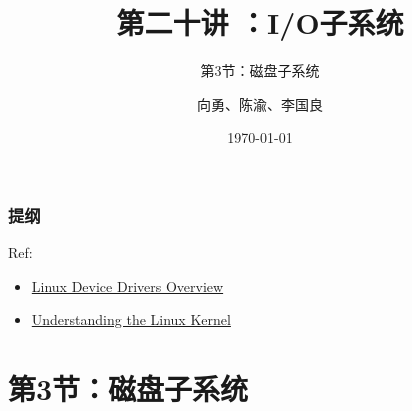 


\title[第20讲]{第二十讲 ：I/O子系统} %
\subtitle{第3节：磁盘子系统}
\author{向勇、陈渝、李国良} %
\date{\today} %



\begin{frame}
\titlepage %
\end{frame}

\begin{frame}
\frametitle{提纲} %
\tableofcontents %

Ref:
    \begin{itemize}
        \item \href{http://osq.cs.berkeley.edu/public/JFoster-Drivers.ppt}{Linux Device Drivers Overview}
        \item \href{http://ermak.cs.nstu.ru/understanding.linux.kernel.pdf}{Understanding the Linux Kernel}
    \end{itemize}

\end{frame}
\section{第3节：磁盘子系统} %
